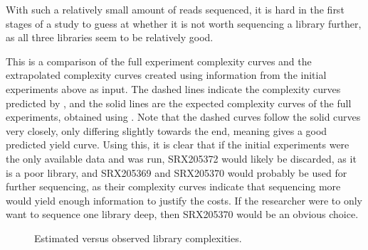\documentclass[11pt, titlepage]{article}
\begin{document}
With such a relatively small amount of reads sequenced, it is hard in the first stages of a study to guess at whether it is not worth sequencing a library further, as all three libraries seem to be relatively good. 

This is a comparison of the full experiment complexity curves and the extrapolated complexity curves created using information from the initial experiments above as input. The dashed lines indicate the complexity curves predicted by , and the solid lines are the expected complexity curves of the full experiments, obtained using . Note that the dashed curves follow the solid curves very closely, only differing slightly towards the end, meaning  gives a good predicted yield curve.  Using this, it is clear that if the initial experiments were the only available data and  was run, SRX205372 would likely be discarded, as it is a poor library, and SRX205369 and SRX205370 would probably be used for further sequencing, as their complexity curves indicate that sequencing more would yield enough information to justify the costs.  If the researcher were to only want to sequence one library deep, then SRX205370 would be an obvious choice. 
\newline
\newline
\begin{figure}[h!]
\centering
{}
\caption{Estimated versus observed library complexities.}
\end{figure}
\end{document}
